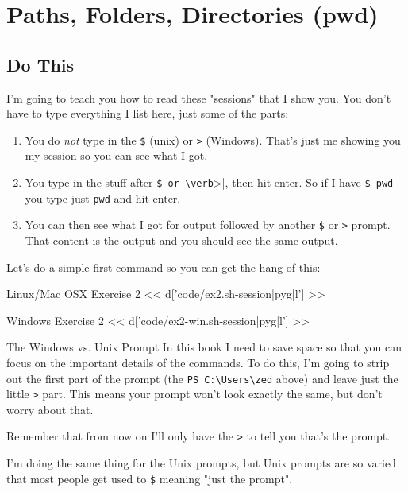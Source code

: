 \chapter{Paths, Folders, Directories (pwd)}

\section{Do This}

I'm going to teach you how to read these "sessions" that I show you.  You don't have to
type everything I list here, just some of the parts:

\begin{enumerate} 
\item You do \emph{not} type in the \verb|$| (unix) or
    \verb|>| (Windows).  That's just me showing you my session so you can see what
    I got.
\item You type in the stuff after \verb|$ or \verb|>|, then hit enter.  So if I have \verb|$ pwd| you type just \verb|pwd| and hit enter.
\item You can then see what I got for output followed by another \verb|$| or \verb|>| prompt.  That content is the output and you should see the same output.
\end{enumerate}

Let's do a simple first command so you can get the hang of this:

\begin{code}{Linux/Mac OSX Exercise 2}
<< d['code/ex2.sh-session|pyg|l'] >>
\end{code}

\begin{code}{Windows Exercise 2}
<< d['code/ex2-win.sh-session|pyg|l'] >>
\end{code}

\begin{aside}{The Windows vs. Unix Prompt}
In this book I need to save space so that you can focus on the important
details of the commands.  To do this, I'm going to strip out the 
first part of the prompt (the \verb|PS C:\Users\zed| above) and leave
just the little \verb|>| part.  This means your prompt won't look
exactly the same, but don't worry about that.

Remember that from now on I'll only have the \verb|>| to tell you
that's the prompt.

I'm doing the same thing for the Unix prompts, but Unix prompts are so
varied that most people get used to \verb|$| meaning "just the prompt".
\end{aside}

